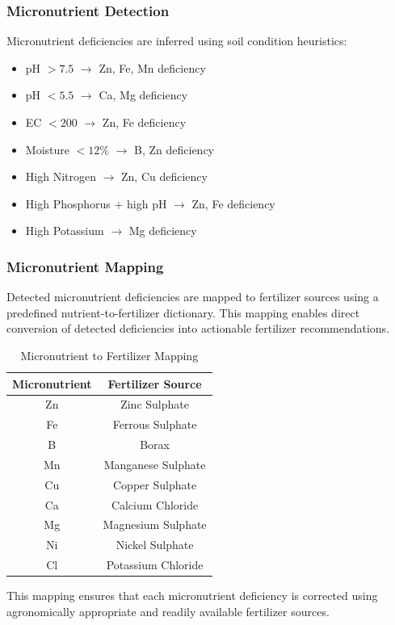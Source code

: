 \documentclass[conference]{IEEEtran}
\begin{document}
\subsubsection{Micronutrient Detection}
Micronutrient deficiencies are inferred using soil condition heuristics:
\begin{itemize}
\item pH $> 7.5$ $\rightarrow$ Zn, Fe, Mn deficiency
\item pH $< 5.5$ $\rightarrow$ Ca, Mg deficiency
\item EC $< 200$ $\rightarrow$ Zn, Fe deficiency
\item Moisture $< 12\%$ $\rightarrow$ B, Zn deficiency
\item High Nitrogen $\rightarrow$ Zn, Cu deficiency
\item High Phosphorus + high pH $\rightarrow$ Zn, Fe deficiency
\item High Potassium $\rightarrow$ Mg deficiency
\end{itemize}

\subsubsection{Micronutrient Mapping}
Detected micronutrient deficiencies are mapped to fertilizer sources using a predefined nutrient-to-fertilizer dictionary. This mapping enables direct conversion of detected deficiencies into actionable fertilizer recommendations.

\begin{table}[!t]
\centering
\caption{Micronutrient to Fertilizer Mapping}
\label{tab:micronutrient-map}
\begin{tabular}{cc}
\hline
Micronutrient & Fertilizer Source \\
\hline
Zn & Zinc Sulphate \\
Fe & Ferrous Sulphate \\
B & Borax \\
Mn & Manganese Sulphate \\
Cu & Copper Sulphate \\
Ca & Calcium Chloride \\
Mg & Magnesium Sulphate \\
Ni & Nickel Sulphate \\
Cl & Potassium Chloride \\
\hline
\end{tabular}
\end{table}

This mapping ensures that each micronutrient deficiency is corrected using agronomically appropriate and readily available fertilizer sources.
\end{document}
